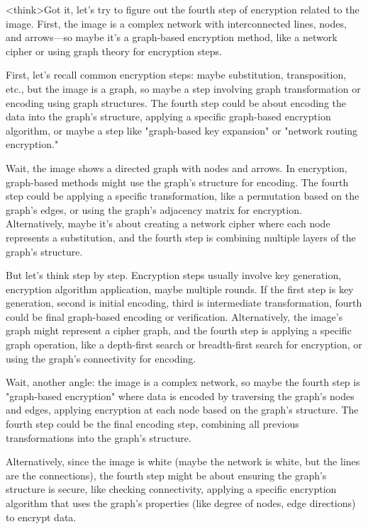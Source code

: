 <think>Got it, let's try to figure out the fourth step of encryption related to the image. First, the image is a complex network with interconnected lines, nodes, and arrows—so maybe it's a graph-based encryption method, like a network cipher or using graph theory for encryption steps. 

First, let's recall common encryption steps: maybe substitution, transposition, etc., but the image is a graph, so maybe a step involving graph transformation or encoding using graph structures. The fourth step could be about encoding the data into the graph's structure, applying a specific graph-based encryption algorithm, or maybe a step like "graph-based key expansion" or "network routing encryption."

Wait, the image shows a directed graph with nodes and arrows. In encryption, graph-based methods might use the graph's structure for encoding. The fourth step could be applying a specific transformation, like a permutation based on the graph's edges, or using the graph's adjacency matrix for encryption. Alternatively, maybe it's about creating a network cipher where each node represents a substitution, and the fourth step is combining multiple layers of the graph's structure.

But let's think step by step. Encryption steps usually involve key generation, encryption algorithm application, maybe multiple rounds. If the first step is key generation, second is initial encoding, third is intermediate transformation, fourth could be final graph-based encoding or verification. Alternatively, the image's graph might represent a cipher graph, and the fourth step is applying a specific graph operation, like a depth-first search or breadth-first search for encryption, or using the graph's connectivity for encoding.

Wait, another angle: the image is a complex network, so maybe the fourth step is "graph-based encryption" where data is encoded by traversing the graph's nodes and edges, applying encryption at each node based on the graph's structure. The fourth step could be the final encoding step, combining all previous transformations into the graph's structure.

Alternatively, since the image is white (maybe the network is white, but the lines are the connections), the fourth step might be about ensuring the graph's structure is secure, like checking connectivity, applying a specific encryption algorithm that uses the graph's properties (like degree of nodes, edge directions) to encrypt data.

